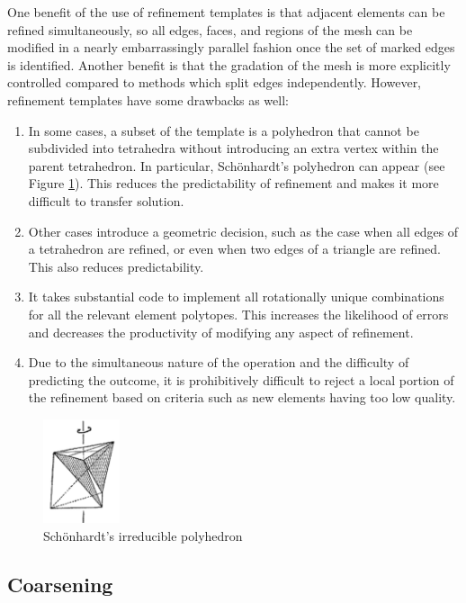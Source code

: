 One benefit of the use of refinement templates is that adjacent elements can be refined
simultaneously, so all edges, faces, and regions of the mesh can be modified in
a nearly embarrassingly parallel fashion once the set of marked edges is identified.
Another benefit is that the gradation of the mesh is more explicitly controlled
compared to methods which split edges independently.
However, refinement templates have some drawbacks as well:
\begin{enumerate}
\item In some cases, a subset of the template is a polyhedron that cannot be
subdivided into tetrahedra without introducing an extra vertex within the
parent tetrahedron.
In particular, Sch{\"o}nhardt's polyhedron can appear (see Figure
\ref{fig:schonhardt}).
This reduces the predictability of refinement and makes it more difficult
to transfer solution.
\item Other cases introduce a geometric decision, such as the case
when all edges of a tetrahedron are refined, or even when two edges
of a triangle are refined. This also reduces predictability.
\item It takes substantial code to implement all rotationally unique
combinations for all the relevant element polytopes.
This increases the likelihood of errors and decreases the productivity
of modifying any aspect of refinement.
\item Due to the simultaneous nature of the operation and the difficulty
of predicting the outcome, it is prohibitively difficult to reject
a local portion of the refinement based on criteria such as new elements
having too low quality.
\end{enumerate}

\begin{figure}
\begin{center}
\includegraphics[width=0.2\textwidth]{schonhardt.png}
\caption{Sch{\"o}nhardt's irreducible polyhedron
\cite{Schonhardt1928}}
\label{fig:schonhardt}
\end{center}
\end{figure}

\subsection{Coarsening}
\label{sec:ma_coarsen}

